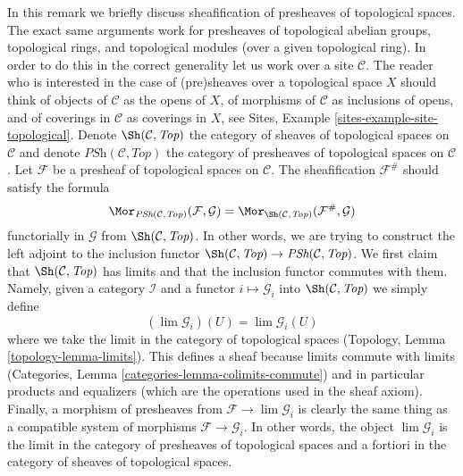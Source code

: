 \begin{remark}
\label{remark-sheafification-of-presheaves-in-top}
\begin{reference}
\cite{Gray}
\end{reference}
In this remark we briefly discuss sheafification of presheaves
of topological spaces. The exact same arguments work for
presheaves of topological abelian groups, topological rings, and
topological modules (over a given topological ring). In order to
do this in the correct generality let us work over a site
$\mathcal{C}$. The reader who is interested in the case of (pre)sheaves
over a topological space $X$ should think of objects of $\mathcal{C}$
as the opens of $X$, of morphisms of $\mathcal{C}$ as inclusions of
opens, and of coverings in $\mathcal{C}$ as coverings in $X$, see
Sites, Example \ref{sites-example-site-topological}.
Denote $\Sh(\mathcal{C}, \textit{Top})$ the category of sheaves
of topological spaces on $\mathcal{C}$ and denote
$\textit{PSh}(\mathcal{C}, \textit{Top})$ the category of presheaves
of topological spaces on $\mathcal{C}$.
Let $\mathcal{F}$ be a presheaf of topological spaces on $\mathcal{C}$.
The sheafification $\mathcal{F}^\#$ should satisfy the formula
$$
\Mor_{\textit{PSh}(\mathcal{C}, \textit{Top})}(\mathcal{F}, \mathcal{G})
=
\Mor_{\Sh(\mathcal{C}, \textit{Top})}(\mathcal{F}^\#, \mathcal{G})
$$
functorially in $\mathcal{G}$ from $\Sh(\mathcal{C}, \textit{Top})$.
In other words, we are trying to construct the left adjoint
to the inclusion functor
$\Sh(\mathcal{C}, \textit{Top}) \to \textit{PSh}(\mathcal{C}, \textit{Top})$.
We first claim that $\Sh(\mathcal{C}, \textit{Top})$ has limits
and that the inclusion functor commutes with them.
Namely, given a category $\mathcal{I}$ and a functor
$i \mapsto \mathcal{G}_i$ into $\Sh(\mathcal{C}, \textit{Top})$
we simply define
$$
(\lim \mathcal{G}_i)(U) = \lim \mathcal{G}_i(U)
$$
where we take the limit in the category of topological spaces
(Topology, Lemma \ref{topology-lemma-limits}). This defines a sheaf
because limits commute with limits
(Categories, Lemma \ref{categories-lemma-colimits-commute})
and in particular products and equalizers (which are the
operations used in the sheaf axiom). Finally, a morphism
of presheaves from $\mathcal{F} \to \lim \mathcal{G}_i$ is
clearly the same thing as a compatible system of morphisms
$\mathcal{F} \to \mathcal{G}_i$. In other words, the object
$\lim \mathcal{G}_i$ is the limit in the category
of presheaves of topological spaces and a fortiori in the
category of sheaves of topological spaces.

\end{remark}
